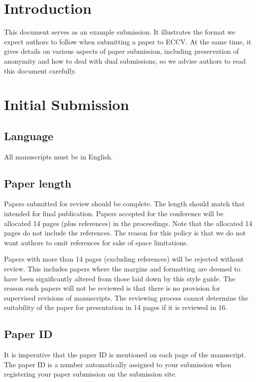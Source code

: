 \documentclass[runningheads]{llncs}
\begin{document}
\section{Introduction}


This document serves as an example submission. It illustrates the format
we expect authors to follow when submitting a paper to ECCV. 
At the same time, it gives details on various aspects of paper submission,
including preservation of anonymity and how to deal with dual submissions,
so we advise authors to read this document carefully.

\section{Initial Submission}

\subsection{Language}

All manuscripts must be in English.

\subsection{Paper length}
Papers submitted for review should be complete. 
The length should match that intended for final publication. 
Papers accepted for the conference will be allocated 14 pages (plus references) in the proceedings. 
Note that the allocated 14 pages do not include the references. The reason for this policy
is that we do not want authors to omit references for sake of space limitations.

Papers with more than 14 pages (excluding references) will be rejected without review.
This includes papers where the margins and
formatting are deemed to have been significantly altered from those
laid down by this style guide.  The reason such papers will not be reviewed is that there is no provision for supervised revisions of manuscripts. The reviewing process cannot determine the suitability of the paper for presentation in 14 pages if it is reviewed in 16.

\subsection{Paper ID}

It is imperative that the paper ID is mentioned on each page of the manuscript.
The paper ID is a number automatically assigned to your submission when 
registering your paper submission on the submission site.
\end{document}
